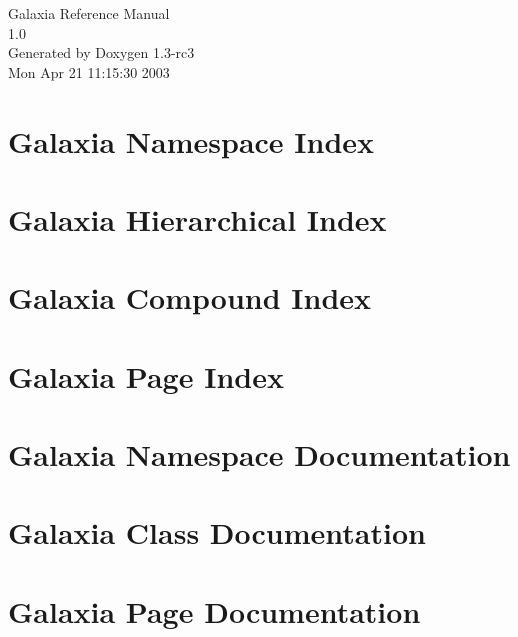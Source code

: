 \documentclass[a4paper]{book}
\begin{document}
\begin{titlepage}
\vspace*{7cm}
\begin{center}
{\Large Galaxia Reference Manual\\[1ex]\large 1.0}\\
\vspace*{1cm}
{\large Generated by Doxygen 1.3-rc3}\\
\vspace*{0.5cm}
{\small Mon Apr 21 11:15:30 2003}\\
\end{center}
\end{titlepage}
\clearemptydoublepage
{}
\tableofcontents
\clearemptydoublepage
{}
\chapter{Galaxia Namespace Index}

\chapter{Galaxia Hierarchical Index}

\chapter{Galaxia Compound Index}

\chapter{Galaxia Page Index}

\chapter{Galaxia Namespace Documentation}

\chapter{Galaxia Class Documentation}







\chapter{Galaxia Page Documentation}

\printindex
\end{document}
